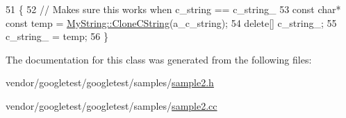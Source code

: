 \begin{DoxyCode}
51                                          \{
52   \textcolor{comment}{// Makes sure this works when c\_string == c\_string\_}
53   \textcolor{keyword}{const} \textcolor{keywordtype}{char}* \textcolor{keyword}{const} temp = \hyperlink{classMyString_a40753dcfa3314a8993f32bdd75d67ce2}{MyString::CloneCString}(a\_c\_string);
54   \textcolor{keyword}{delete}[] c\_string\_;
55   c\_string\_ = temp;
56 \}
\end{DoxyCode}


The documentation for this class was generated from the following files\+:\begin{DoxyCompactItemize}
\item 
vendor/googletest/googletest/samples/\hyperlink{sample2_8h}{sample2.\+h}\item 
vendor/googletest/googletest/samples/\hyperlink{sample2_8cc}{sample2.\+cc}\end{DoxyCompactItemize}
